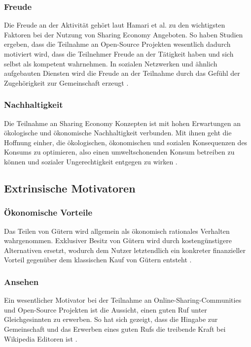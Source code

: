 \documentclass[a4paper]{scrartcl}
\begin{document}
\begin{multicols}{2}
			\subsubsection{Freude}
				Die Freude an der Aktivit\"at geh\"ort laut Hamari et al. zu den wichtigsten Faktoren bei der Nutzung von Sharing Economy Angeboten. So haben Studien ergeben, dass die Teilnahme an Open-Source Projekten wesentlich dadurch motiviert wird, dass die Teilnehmer Freude an der T\"atigkeit haben und sich selbst als kompetent wahrnehmen. In sozialen Netzwerken und \"ahnlich aufgebauten Diensten wird die Freude an der Teilnahme durch das Gef\"uhl der Zugeh\"origkeit zur Gemeinschaft erzeugt \cite{doi:10.1002/asi.23552}.
			
			\subsubsection{Nachhaltigkeit}
				Die Teilnahme an Sharing Economy Konzepten ist mit hohen Erwartungen an \"okologische und \"okonomische Nachhaltigkeit verbunden. Mit ihnen geht die Hoffnung einher, die \"okologischen, \"okonomischen und sozialen Konsequenzen des Konsums zu optimieren, also einen umweltschonenden Konsum betreiben zu k\"onnen und sozialer Ungerechtigkeit entgegen zu wirken \cite{doi:10.1002/asi.23552}.
				
			
			
		\subsection{Extrinsische Motivatoren}
		
			\subsubsection{\"Okonomische Vorteile}
				Das Teilen von G\"utern wird allgemein als \"okonomisch rationales Verhalten wahrgenommen. Exklusiver Besitz von G\"utern wird durch kosteng\"unstigere Alternativen ersetzt, wodurch dem Nutzer letztendlich ein konkreter finanzieller Vorteil gegen\"uber dem klassischen Kauf von G\"utern entsteht \cite{doi:10.1002/asi.23552}.
			
			\subsubsection{Ansehen}
				Ein wesentlicher Motivator bei der Teilnahme an Online-Sharing-Communities und Open-Source Projekten ist die Aussicht, einen guten Ruf unter Gleichgesinnten zu erwerben. So hat sich gezeigt, dass die Hingabe zur Gemeinschaft und das Erwerben eines guten Rufs die treibende Kraft bei Wikipedia Editoren ist \cite{doi:10.1002/asi.23552}.
			

\end{multicols}
\end{document}

